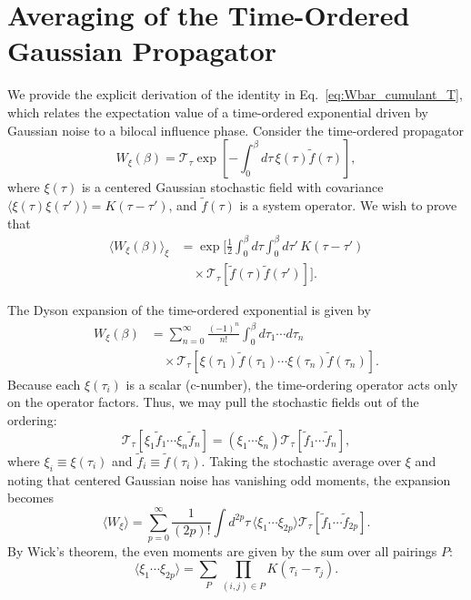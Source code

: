 ﻿%
\section{Averaging of the Time-Ordered Gaussian Propagator}
\label{app:gaussian_averaging}

We provide the explicit derivation of the identity in Eq.~\eqref{eq:Wbar_cumulant_T}, which relates the expectation value of a time-ordered exponential driven by Gaussian noise to a bilocal influence phase. Consider the time-ordered propagator
\begin{equation}
    W_\xi(\beta) = \mathcal{T}_\tau \exp\left[ -\int_0^\beta d\tau \, \xi(\tau) \tilde{f}(\tau) \right],
\end{equation}
where $\xi(\tau)$ is a centered Gaussian stochastic field with covariance $\langle \xi(\tau)\xi(\tau')\rangle = K(\tau-\tau')$, and $\tilde{f}(\tau)$ is a system operator. We wish to prove that
\begin{equation}
    \begin{split}
        \langle W_\xi(\beta) \rangle_\xi &= \exp\bigg[ \frac{1}{2} \int_0^\beta d\tau \int_0^\beta d\tau' \, K(\tau-\tau') \\
        &\quad \times \mathcal{T}_\tau \left[ \tilde{f}(\tau) \tilde{f}(\tau') \right] \bigg].
    \end{split}
\end{equation}

The Dyson expansion of the time-ordered exponential is given by
\begin{equation}
    \begin{split}
        W_\xi(\beta) &= \sum_{n=0}^\infty \frac{(-1)^n}{n!} \int_0^\beta d\tau_1 \cdots d\tau_n \\
        &\quad \times \mathcal{T}_\tau \left[ \xi(\tau_1)\tilde{f}(\tau_1) \cdots \xi(\tau_n)\tilde{f}(\tau_n) \right].
    \end{split}
\end{equation}
Because each $\xi(\tau_i)$ is a scalar (c-number), the time-ordering operator acts only on the operator factors. Thus, we may pull the stochastic fields out of the ordering:
\begin{equation}
    \mathcal{T}_\tau \left[ \xi_1 \tilde{f}_1 \cdots \xi_n \tilde{f}_n \right] = (\xi_1 \cdots \xi_n) \mathcal{T}_\tau \left[ \tilde{f}_1 \cdots \tilde{f}_n \right],
\end{equation}
where $\xi_i \equiv \xi(\tau_i)$ and $\tilde{f}_i \equiv \tilde{f}(\tau_i)$. Taking the stochastic average over $\xi$ and noting that centered Gaussian noise has vanishing odd moments, the expansion becomes
\begin{equation}
    \langle W_\xi \rangle = \sum_{p=0}^\infty \frac{1}{(2p)!} \int d^{2p}\tau \, \langle \xi_1 \cdots \xi_{2p} \rangle \mathcal{T}_\tau \left[ \tilde{f}_1 \cdots \tilde{f}_{2p} \right].
    \label{eq:app_lhs_expanded}
\end{equation}
By Wick's theorem, the even moments are given by the sum over all pairings $P$:
\begin{equation}
    \langle \xi_1 \cdots \xi_{2p} \rangle = \sum_P \prod_{(i,j) \in P} K(\tau_i - \tau_j).
\end{equation}

